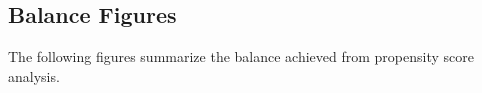 \clearpage
\makeatletter
\efloat@restorefloats
\makeatother


\begin{appendix}
\hypertarget{balance-figures}{%
\section{Balance Figures}\label{balance-figures}}

The following figures summarize the balance achieved from propensity
score analysis.
\end{appendix}
